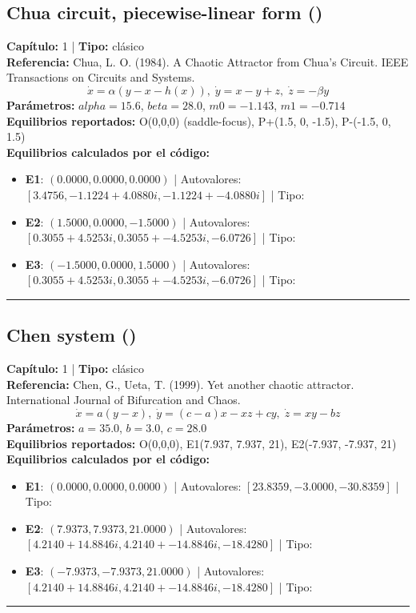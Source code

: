 \subsection*{Chua circuit, piecewise-linear form ()}
\textbf{Capítulo:} 1 | \textbf{Tipo:} clásico\\
\textbf{Referencia:} Chua, L. O. (1984). A Chaotic Attractor from Chua's Circuit. IEEE Transactions on Circuits and Systems.\\
\[\dot{x}=\alpha(y-x-h(x)), \; \dot{y}=x-y+z, \; \dot{z}=-\beta y\]
\textbf{Parámetros:} $alpha = 15.6$, $beta = 28.0$, $m0 = -1.143$, $m1 = -0.714$\\
\textbf{Equilibrios reportados:} O(0,0,0) (saddle-focus), P+(1.5, 0, -1.5), P-(-1.5, 0, 1.5)\\
\textbf{Equilibrios calculados por el código:}
\begin{itemize}
  \item \textbf{E1}: $(0.0000, 0.0000, 0.0000)$ | Autovalores: $[3.4756, -1.1224 + 4.0880i, -1.1224 + -4.0880i]$ | Tipo: 
  \item \textbf{E2}: $(1.5000, 0.0000, -1.5000)$ | Autovalores: $[0.3055 + 4.5253i, 0.3055 + -4.5253i, -6.0726]$ | Tipo: 
  \item \textbf{E3}: $(-1.5000, 0.0000, 1.5000)$ | Autovalores: $[0.3055 + 4.5253i, 0.3055 + -4.5253i, -6.0726]$ | Tipo: 
\end{itemize}
\hrule

\subsection*{Chen system ()}
\textbf{Capítulo:} 1 | \textbf{Tipo:} clásico\\
\textbf{Referencia:} Chen, G., Ueta, T. (1999). Yet another chaotic attractor. International Journal of Bifurcation and Chaos.\\
\[\dot{x}=a(y-x), \; \dot{y}=(c-a)x-xz+cy, \; \dot{z}=xy-bz\]
\textbf{Parámetros:} $a = 35.0$, $b = 3.0$, $c = 28.0$\\
\textbf{Equilibrios reportados:} O(0,0,0), E1(7.937, 7.937, 21), E2(-7.937, -7.937, 21)\\
\textbf{Equilibrios calculados por el código:}
\begin{itemize}
  \item \textbf{E1}: $(0.0000, 0.0000, 0.0000)$ | Autovalores: $[23.8359, -3.0000, -30.8359]$ | Tipo: 
  \item \textbf{E2}: $(7.9373, 7.9373, 21.0000)$ | Autovalores: $[4.2140 + 14.8846i, 4.2140 + -14.8846i, -18.4280]$ | Tipo: 
  \item \textbf{E3}: $(-7.9373, -7.9373, 21.0000)$ | Autovalores: $[4.2140 + 14.8846i, 4.2140 + -14.8846i, -18.4280]$ | Tipo: 
\end{itemize}
\hrule

